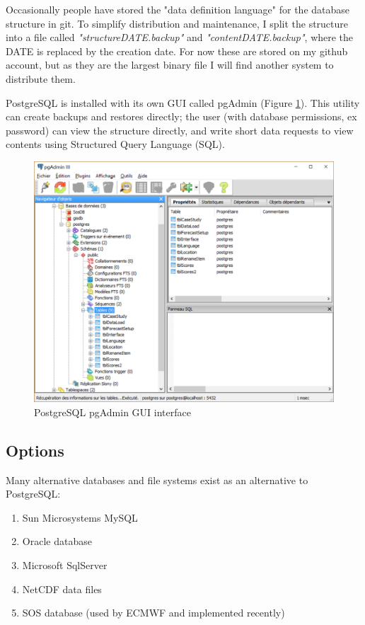 \documentclass[logos,parttoc,morelanguage=french,morelanguage=german]{orsay-memoire}
\begin{document}
Occasionally people have stored the "data definition language" for the database structure in git. To simplify distribution and maintenance, I split the structure into a file called \textit{"structureDATE.backup"} and \textit{"contentDATE.backup"}, where the DATE is replaced by the creation date. For now these are stored on my github account, but as they are the largest binary file I will find another system to distribute them.

PostgreSQL is installed with its own GUI called pgAdmin (Figure \ref{fig:pgAdmin}). This utility can create backups and restores directly; the user (with database permissions, ex password) can view the structure directly, and write short data requests to view contents using Structured Query Language (SQL).

\begin{figure}[H]
\centering
\includegraphics[width=0.7\linewidth]{images/pgAdmin1.png}
  \caption{PostgreSQL pgAdmin GUI interface}
  \label{fig:pgAdmin}
\end{figure}

\subsection{Options}

Many alternative databases and file systems exist as an alternative to PostgreSQL:

\begin{enumerate}
\item Sun Microsystems MySQL
\item Oracle database
\item Microsoft SqlServer
\item NetCDF data files
\item SOS database (used by ECMWF and implemented recently)
\end{enumerate}
\end{document}
